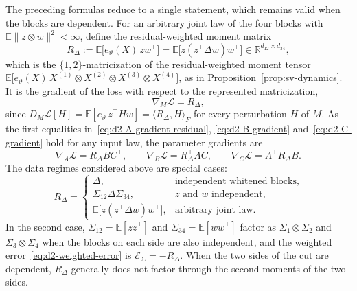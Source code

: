 \documentclass[11pt]{article}
\newcommand{\R}{\mathbb{R}}
\newcommand{\E}{\mathbb{E}}
\newcommand{\ip}[2]{\langle #1,#2\rangle}
\newcommand{\norm}[1]{\lVert #1\rVert}
\theoremstyle{definition}
\numberwithin{equation}{section}
\begin{document}
The preceding formulas reduce to a single statement, which remains valid when the blocks are dependent. For an arbitrary joint law of the four blocks with $\E\norm{z\otimes w}^2<\infty$, define the residual-weighted moment matrix
\begin{equation}\label{eq:d2-residual-moment}
R_\Delta:=\E\big[e_\vartheta(X)\,zw^\top\big]=\E\big[z(z^\top\Delta w)w^\top\big]\in\R^{d_{12}\times d_{34}},
\end{equation}
which is the $\{1,2\}$-matricization of the residual-weighted moment tensor $\E\big[e_\vartheta(X)\,X^{(1)}\otimes X^{(2)}\otimes X^{(3)}\otimes X^{(4)}\big]$, as in Proposition~\ref{prop:sv-dynamics}. It is the gradient of the loss with respect to the represented matricization,
\begin{equation}\label{eq:d2-general-coeff-gradient}
\nabla_M\mathcal L=R_\Delta,
\end{equation}
since $D_M\mathcal L[H]=\E[e_\vartheta\,z^\top Hw]=\ip{R_\Delta}{H}_F$ for every perturbation $H$ of $M$. As the first equalities in~\eqref{eq:d2-A-gradient-residual}, \eqref{eq:d2-B-gradient} and~\eqref{eq:d2-C-gradient} hold for any input law, the parameter gradients are
\begin{equation}\label{eq:d2-general-gradients}
\nabla_A\mathcal L=R_\Delta BC^\top,\qquad\nabla_B\mathcal L=R_\Delta^\top AC,\qquad\nabla_C\mathcal L=A^\top R_\Delta B.
\end{equation}
The data regimes considered above are special cases:
\begin{equation}\label{eq:d2-three-regimes}
R_\Delta=
\begin{cases}
\Delta, & \text{independent whitened blocks},\\[1mm]
\Sigma_{12}\Delta\Sigma_{34}, & \text{$z$ and $w$ independent},\\[1mm]
\E\big[z(z^\top\Delta w)w^\top\big], & \text{arbitrary joint law}.
\end{cases}
\end{equation}
In the second case, $\Sigma_{12}=\E[zz^\top]$ and $\Sigma_{34}=\E[ww^\top]$ factor as $\Sigma_1\otimes\Sigma_2$ and $\Sigma_3\otimes\Sigma_4$ when the blocks on each side are also independent, and the weighted error~\eqref{eq:d2-weighted-error} is $\mathcal E_\Sigma=-R_\Delta$. When the two sides of the cut are dependent, $R_\Delta$ generally does not factor through the second moments of the two sides.
\end{document}
